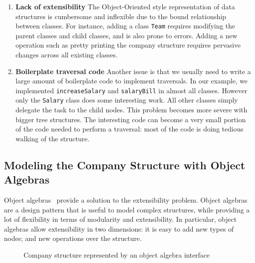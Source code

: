 \begin{enumerate}

\item {\bf Lack of extensibility} The Object-Oriented style
  representation of data structures is cumbersome and
  inflexible due to the bound relationship between classes. For
  instance, adding a class \lstinline{Team} requires modifying the
  parent classes and child classes, and is also prone to errors.
  Adding a new operation such as pretty
  printing the company structure requires pervasive changes across all
  existing classes.

\item {\bf Boilerplate traversal code} Another issue is
  that we usually need to write a large amount of boilerplate code to
  implement traversals. In
  our example, we implemented \lstinline{increaseSalary} and
  \lstinline{salaryBill} in almost all classes. However only the
  \lstinline{Salary} class does some interesting work. All other classes
  simply delegate the task to the child nodes. This problem becomes
  more severe with bigger tree structures. The interesting code can
  become a very small portion of the code needed to perform a
  traversal: most of the code is doing tedious
  walking of the structure.

\end{enumerate}

\subsection{Modeling the Company Structure with Object Algebras}

Object algebras~\cite{bruno12oa} provide a solution to the extensibility problem.
Object algebras are a design pattern that is useful to model complex
structures, while providing a lot of flexibility in terms of
modularity and extensibility. In particular, object algebras allow
extensibility in two dimensions: it is easy to add new types of
nodes; and new operations over the structure.

\begin{figure}[tb]
\vspace{-.1in}
\caption{Company structure represented by an object algebra interface}
\label{syb_tree}
\end{figure}

